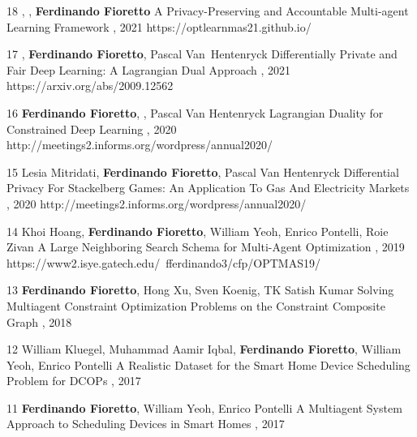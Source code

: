 \begin{pubs}
\wsentry
	{18} %
	{, , {\bf Ferdinando Fioretto}}
	{A Privacy-Preserving and Accountable Multi-agent Learning Framework}
	{, 2021}
	{https://optlearnmas21.github.io/}

\wsentry
	{17} %
	{, {\bf Ferdinando Fioretto}, Pascal Van~Hentenryck}
	{Differentially Private and Fair Deep Learning: A Lagrangian Dual Approach}
	{, 2021}
	{https://arxiv.org/abs/2009.12562}

\wsentry 
	{16} %
	{{\bf Ferdinando Fioretto}, , Pascal Van Hentenryck}
	{Lagrangian Duality for Constrained Deep Learning}
	{, 2020}
	{http://meetings2.informs.org/wordpress/annual2020/}

\wsentry 
	{15} %
	{Lesia Mitridati, {\bf Ferdinando Fioretto}, Pascal Van Hentenryck}
	{Differential Privacy For Stackelberg Games: An Application To Gas And Electricity Markets}
	{, 2020}
	{http://meetings2.informs.org/wordpress/annual2020/}

\wsentry 
	{14} %
	{Khoi Hoang, {\bf Ferdinando Fioretto}, William Yeoh, Enrico Pontelli, Roie Zivan}
	{A Large Neighboring Search Schema for Multi-Agent Optimization} 
	{, 2019}
	{https://www2.isye.gatech.edu/~fferdinando3/cfp/OPTMAS19/}

\wsentry
	{13} %
	{{\bf Ferdinando Fioretto}, Hong Xu, Sven Koenig, TK Satish Kumar}
	{Solving Multiagent Constraint Optimization Problems on the Constraint Composite Graph} 
	{, 2018}
	{~}

\wsentry
	{12} %
	{William Kluegel, Muhammad Aamir Iqbal, {\bf Ferdinando Fioretto}, William Yeoh, Enrico Pontelli}
	{A Realistic Dataset for the Smart Home Device Scheduling Problem for DCOPs}
	{, 
	2017}
	{~}	

\wsentry
	{11} %
	{{\bf Ferdinando Fioretto},  William Yeoh, Enrico Pontelli}
	{A Multiagent System Approach to Scheduling Devices in Smart Homes}
	{, 2017}
	{~}


\end{pubs}
